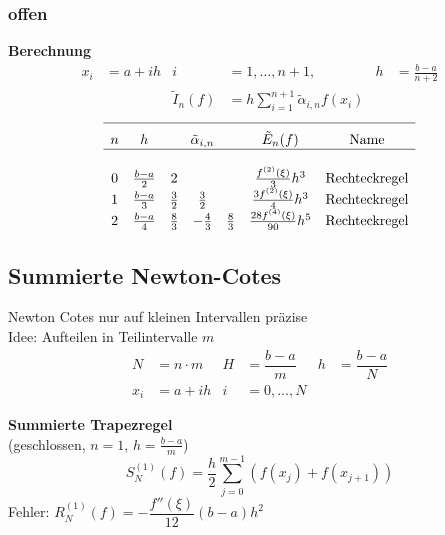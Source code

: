 \documentclass[
	ngerman,
	accentcolor=9c,%
	type=intern,
	marginpar=false
	]{tudapub}
\begin{document}
        \subsubsection{offen}
        \textbf{Berechnung}
        \begin{align*}
            x_i &= a+ih &  i&=1,\dots,n+1, &  h&=\frac{b-a}{n+2} \\
            & & \tilde{I}_n(f) &= h \sum^{n+1}_{i=1} \tilde{\alpha}_{i,n} f(x_i)
        \end{align*}
        \begin{equation*}
            \begin{array}{c c c c c c c}
                \hline\\[-.5\normalbaselineskip]
                n & h & \multicolumn{3}{c}{\tilde{\alpha}_{i,n}}& \tilde{E}_n (f) & \text{Name}\\
                \hline\\
                0 & \frac{b-a}{2} & 2 & & & \frac{f^{(2)}(\xi)}{3}h^3 & \text{Rechteckregel}\\
                1 & \frac{b-a}{3} & \frac{3}{2} & \frac{3}{2} & & \frac{3f^{(2)}(\xi)}{4}h^3 & \text{Rechteckregel}\\
                2 & \frac{b-a}{4} & \frac{8}{3} & -\frac{4}{3} & \frac{8}{3} & \frac{28f^{(4)}(\xi)}{90}h^5 & \text{Rechteckregel}\\
            \end{array}
        \end{equation*}
        \newpage
    \subsection{Summierte Newton-Cotes}
    Newton Cotes nur auf kleinen Intervallen präzise\\
    Idee: Aufteilen in Teilintervalle $m$
    \begin{align*}
        N &= n \cdot m & H&= \dfrac{b-a}{m} & h&= \dfrac{b-a}{N}\\
        x_i &=  a + ih & i&= 0,\dots, N
    \end{align*}

    \textbf{Summierte Trapezregel}\\
    (geschlossen, $n=1$, $h  = \frac{b-a}{m}$)
    \begin{equation*}
        S^{(1)}_N(f) = \dfrac{h}{2} \sum_{j=0}^{m-1}(f(x_j) + f(x_{j+1})) 
    \end{equation*}
    Fehler: $R^{(1)}_N(f)=-\dfrac{f''(\xi)}{12}(b-a)h^2$\\[2ex]
      
\end{document}
